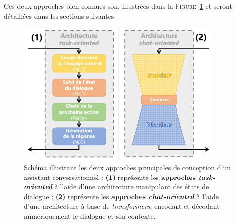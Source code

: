 		Ces deux approches bien connues sont illustrées dans la \textsc{Figure~\ref{figure:B.2-ANNEXE-CHATBOT-APPROCHES}} et seront détaillées dans les sections suivantes.
		\begin{figure}[H]
			\centering
			\includegraphics[width=0.90\textwidth]{figures/annexe-chatbots-architectures}
			\caption{
				Schéma illustrant les deux approches principales de conception d'un assistant conversationnel :
				\textbf{(1)} représente les \textbf{approches \textit{task-oriented}} à l'aide d'une architecture manipulant des états de dialogue ;
				\textbf{(2)} représente les \textbf{approches \textit{chat-oriented}} à l'aide d'une architecture à base de \textit{transformers}, encodant et décodant numériquement le dialogue et son contexte.
			}
			\label{figure:B.2-ANNEXE-CHATBOT-APPROCHES}
		\end{figure}
		
		

		
			
